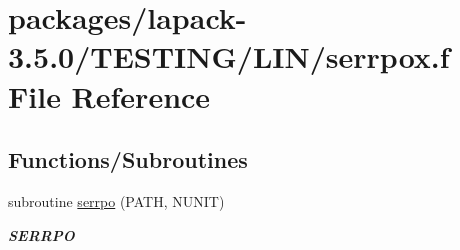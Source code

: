 \hypertarget{serrpox_8f}{}\section{packages/lapack-\/3.5.0/\+T\+E\+S\+T\+I\+N\+G/\+L\+I\+N/serrpox.f File Reference}
\label{serrpox_8f}
\subsection*{Functions/\+Subroutines}
\begin{DoxyCompactItemize}
\item 
subroutine \hyperlink{group__single__lin_ga0aabd070de73f57629e42c77ddbddd4c}{serrpo} (P\+A\+T\+H, N\+U\+N\+I\+T)
\begin{DoxyCompactList}\small\item\em {\bfseries S\+E\+R\+R\+P\+O} \end{DoxyCompactList}\end{DoxyCompactItemize}
